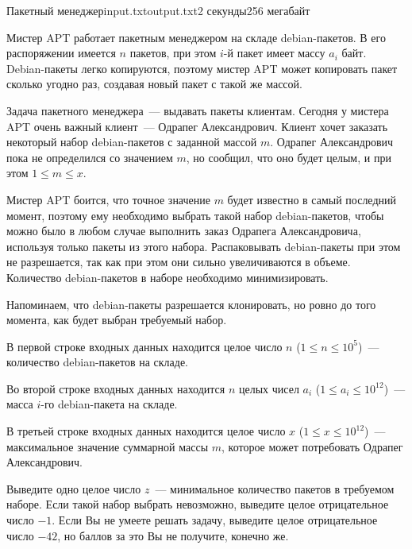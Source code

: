 \begin{problem}{Пакетный менеджер}{input.txt}{output.txt}{2 секунды}{256 мегабайт}

Мистер APT работает пакетным менеджером на складе debian-пакетов. В его распоряжении имеется $n$ пакетов, при этом $i$-й пакет имеет массу $a_i$ байт. Debian-пакеты легко копируются, поэтому мистер APT может копировать пакет сколько угодно раз, создавая новый пакет с такой же массой.

Задача пакетного менеджера~--- выдавать пакеты клиентам. Сегодня у мистера APT очень важный клиент~--- Одрапег Александрович. Клиент хочет заказать некоторый набор debian-пакетов с заданной массой $m$. Одрапег Александрович пока не определился со значением $m$, но сообщил, что оно будет целым, и при этом $1 \le m \le x$.

Мистер APT боится, что точное значение $m$ будет известно в самый последний момент, поэтому ему необходимо выбрать такой набор debian-пакетов, чтобы можно было в любом случае выполнить заказ Одрапега Александровича, используя только пакеты из этого набора. Распаковывать debian-пакеты при этом не разрешается, так как при этом они сильно увеличиваются в объеме. Количество debian-пакетов в наборе необходимо минимизировать.

Напоминаем, что debian-пакеты разрешается клонировать, но ровно до того момента, как будет выбран требуемый набор.

\InputFile

В первой строке входных данных находится целое число $n$ ($1 \le n \le 10^5$)~--- количество debian-пакетов на складе.

Во второй строке входных данных находится $n$ целых чисел $a_i$ ($1 \le a_i \le 10^{12}$)~--- масса $i$-го debian-пакета на складе.

В третьей строке входных данных находится целое число $x$ ($1 \le x \le 10^{12}$)~--- максимальное значение суммарной массы $m$, которое может потребовать Одрапег Александрович.

\OutputFile

Выведите одно целое число $z$~--- минимальное количество пакетов в требуемом наборе. Если такой набор выбрать невозможно, выведите целое отрицательное число $-1$. Если Вы не умеете решать задачу, выведите целое отрицательное число $-42$, но баллов за это Вы не получите, конечно же.

\Examples

\begin{example}
%
%
%
%
\end{example}


\end{problem}
